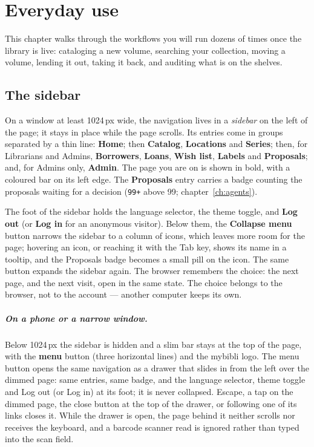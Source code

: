 \chapter{Everyday use}
\label{ch:usage}

This chapter walks through the workflows you will run dozens of
times once the library is live: cataloging a new volume, searching
your collection, moving a volume, lending it out, taking it back,
and auditing what is on the shelves.

\section{The sidebar}\label{sec:navbar}

On a window at least 1024\,px wide, the navigation lives in a
\emph{sidebar} on the left of the page; it stays in
place while the page scrolls. Its entries come in groups separated by
a thin line: \textbf{Home}; then \textbf{Catalog}, \textbf{Locations}
and \textbf{Series}; then, for Librarians and Admins,
\textbf{Borrowers}, \textbf{Loans}, \textbf{Wish list},
\textbf{Labels} and \textbf{Proposals}; and, for Admins only,
\textbf{Admin}. The page you are on is shown in bold, with a coloured
bar on its left edge. The \textbf{Proposals} entry carries a badge
counting the proposals waiting for a decision (\texttt{99+} above 99;
chapter~\ref{ch:agents}).

The foot of the sidebar holds the language selector, the theme toggle,
and \textbf{Log out} (or \textbf{Log in} for an anonymous visitor).
Below them, the \textbf{Collapse menu} button narrows the sidebar to a
column of icons, which leaves more room for the page; hovering an icon,
or reaching it with the Tab key, shows its name in a tooltip, and the
Proposals badge becomes a small pill on the icon. The same button
expands the sidebar again. The browser remembers the choice: the next
page, and the next visit, open in the same state. The choice belongs to
the browser, not to the account --- another computer keeps its own.

\paragraph{On a phone or a narrow window.} Below 1024\,px the sidebar
is hidden and a slim bar stays at the top of the page, with the
\textbf{menu} button (three horizontal lines) and the mybibli logo.
The menu button opens the same navigation as a drawer that slides in
from the left over the dimmed page: same entries, same badge, and the
language selector, theme toggle and Log out (or Log in) at its foot;
it is never collapsed. Escape, a tap on the dimmed page, the close
button at the top of the drawer, or following one of its links closes
it. While the drawer is open, the page behind it neither scrolls nor
receives the keyboard, and a barcode scanner read is ignored rather
than typed into the scan field.

